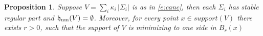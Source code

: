 \documentclass[12pt,twoside]{amsart}
\numberwithin{equation}{section}
\renewcommand{\leq}{\leqslant}
\newtheorem{proposition}[theorem]{Proposition}
\renewcommand{\cH}{\mathcal H}
\DeclareMathOperator{\Per}{Per}
\newcommand{\eps}{\varepsilon}
\DeclareMathOperator{\hnm}{\mathfrak{h}_\textnormal{nm}}
\begin{document}


\begin{proposition}\label{p:def-thm-cancel}
Suppose $V=\sum_i\kappa_i \,|\Sigma_i|$ is as in \eqref{e:canc}, then each $\Sigma_i$ has stable regular part and $\hnm(V) = \emptyset$.
Moreover, for every point 
$x \in support(V)$
there exists $r>0$, such that 
the support of $V$ is minimizing to one side in $B_r(x)$
\end{proposition}
\end{document}

